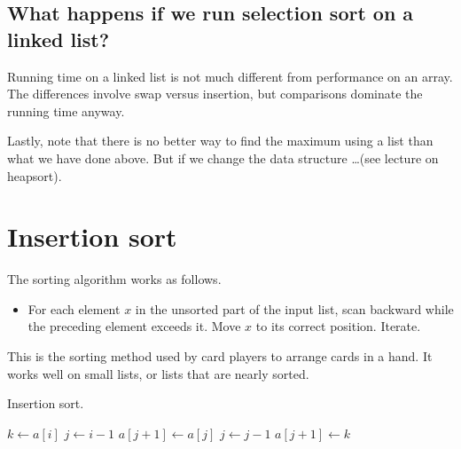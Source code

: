 \section{What happens if we run selection sort on a linked list?}
Running time on a linked list is not much different from performance on an array. 
The differences involve swap versus insertion, but comparisons dominate the running time anyway.

Lastly, note that there is no better way to find the maximum using a list than what we have done above. 
But if we change the data structure \dots (see lecture on heapsort).


\chapter{Insertion sort} %
\label{sec:insertionsort}
The sorting algorithm  works as follows.
\begin{itemize}
	\item For each element $x$ in the unsorted part of the input list, 
	scan backward while the preceding element exceeds it. 
	Move $x$ to its correct position. Iterate.
\end{itemize}
This is the sorting method used by card players to arrange cards in a hand.
It works well on small lists, or lists that are nearly sorted.

\begin{algorithm}[H]
  \caption{Insertion sort.}
  \label{alg:insort}
\begin{algorithmic}[1]
		\State $k \gets a[i]$ 
		\State $j \gets i - 1$
			\State {}
			\State $a[j+1] \gets a[j]$
			\State $j \gets j - 1$
		\EndWhile
		\State $a[j+1] \gets k$ 
	\EndFor
	\State {}
\EndFunction  
\end{algorithmic}
\end{algorithm}


